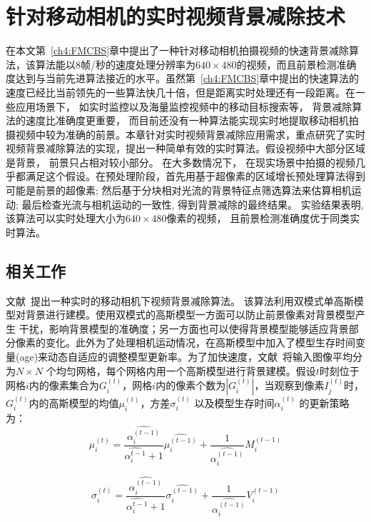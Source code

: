 \chapter{针对移动相机的实时视频背景减除技术}
在本文第~\ref{ch4:FMCBS}章中提出了一种针对移动相机拍摄视频的快速背景减除算法，该算法能以8帧/秒的速度处理分辨率为$640 \times 480$的视频，而且前景检测准确度达到与当前先进算法接近的水平。虽然第~\ref{ch4:FMCBS}章中提出的快速算法的速度已经比当前领先的一些算法\cite{gbsuperpixel}快几十倍，但是距离实时处理还有一段距离。在一些应用场景下， 如实时监控以及海量监控视频中的移动目标搜索等， 背景减除算法的速度比准确度更重要， 而目前还没有一种算法能实现实时地提取移动相机拍摄视频中较为准确的前景。本章针对实时视频背景减除应用需求，重点研究了实时视频背景减除算法的实现，提出一种简单有效的实时算法。假设视频中大部分区域是背景， 前景只占相对较小部分。 在大多数情况下， 在现实场景中拍摄的视频几乎都满足这个假设。在预处理阶段，首先用基于超像素的区域增长预处理算法得到可能是前景的超像素; 然后基于分块相对光流的背景特征点筛选算法来估算相机运动; 最后检查光流与相机运动的一致性, 得到背景减除的最终结果。 实验结果表明, 该算法可以实时处理大小为$640 \times 480$像素的视频， 且前景检测准确度优于同类实时算法。



\section{相关工作}
\label{ch5:sec:relatedWorks}
 文献~提出一种实时的移动相机下视频背景减除算法。 该算法利用双模式单高斯模型对背景进行建模。使用双模式的高斯模型一方面可以防止前景像素对背景模型产生 干扰，影响背景模型的准确度；另一方面也可以使得背景模型能够适应背景部分像素的变化。此外为了处理相机运动情况，在高斯模型中加入了模型生存时间变量(age)来动态自适应的调整模型更新率。为了加快速度，文献~将输入图像平均分为$ N \times N $ 个均匀网格，每个网格内用一个高斯模型进行背景建模。假设$t$时刻位于网格$i$内的像素集合为$ G_{i}^{(t)}$，网格$i$内的像素个数为$ |G_{i}^{(t)}|$，当观察到像素$ I_j^{(t)}$时，$G_i^{(t)}$内的高斯模型的均值$ \mu_i^{(t)}$，方差$ \sigma_i^{(t)}$ 以及模型生存时间$\alpha_i^{(t)}$ 的更新策略为：
 $$\mu_i^{(t)} = \frac{\hat{\alpha_i^{(t-1)}}}{\hat{\alpha_i^{t-1}}+1}\hat{\mu_i^{(t-1)}} + \frac{1}{\hat{\alpha_i^{(t-1)}}}M_i^{(t-1)}$$

$$\sigma_i^{(t)} = \frac{\hat{\alpha_i^{(t-1)}}}{\hat{\alpha_i^{t-1}}+1}\hat{\sigma_i^{(t-1)}} + \frac{1}{\hat{\alpha_i^{(t-1)}}}V_i^{(t-1)}$$

